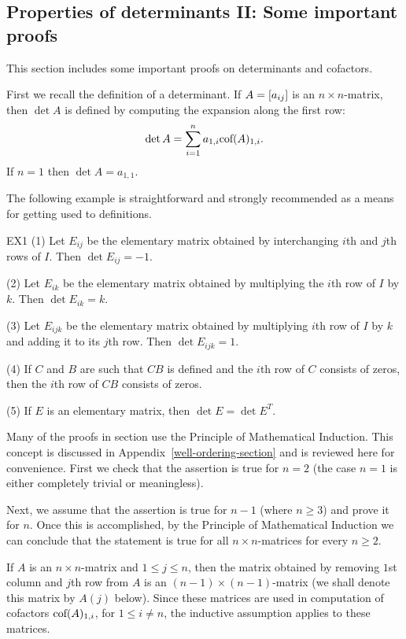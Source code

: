 \subsection{Properties of determinants II: Some important proofs } \label{sec:determinant-proofs}

This section includes some important proofs on determinants and cofactors.

First we recall the definition of a determinant. If $A=\left[a_{ij} \right]$ is an $n\times n$-matrix, then $\det A$ is defined by computing the expansion along the first row:
\begin{equation}
\label{E1} 
\det A=\sum_{i=1}^n a_{1,i} \mbox{\rm cof}(A)_{1,i}. 
\end{equation}
If $n=1$ then $\det A=a_{1,1}$. 

The following example is straightforward and strongly recommended as a means for
getting used to definitions. 

\begin{example}{}{EX1}
(1) Let $E_{ij}$ be the elementary matrix obtained by interchanging $i$th and $j$th rows of $I$. 
Then $\det E_{ij}=-1$. 

(2) Let $E_{ik}$ be the elementary matrix obtained by multiplying the $i$th row of $I$ by $k$. 
Then $\det E_{ik}=k$. 

(3) Let $E_{ijk}$ be the elementary matrix obtained by multiplying $i$th row of $I$ by $k$ and 
adding it to its $j$th row. Then $\det E_{ijk}=1$. 

(4) If $C$ and $B$ are such that $CB$ is defined and the $i$th row of $C$ consists of zeros, 
then the $i$th row of $CB$ consists of zeros. 

(5) If $E$ is an elementary matrix, then $\det E=\det E^T$. 
\end{example} 

Many of the proofs in section use the Principle of Mathematical Induction. This concept is discussed in Appendix~\ref{well-ordering-section} and is reviewed here for convenience.
First we check that the assertion is true for $n=2$ (the case $n=1$ is either completely trivial
or meaningless). 

Next, we assume that the assertion is true for $n-1$ (where $n\geq 3$) and prove it for $n$. 
Once this is accomplished, by the Principle of Mathematical Induction we can conclude that the 
statement is true for all $n\times n$-matrices for every $n\geq 2$. 

If $A$ is an $n\times n$-matrix and $1\leq j \leq n$,
then the matrix obtained by removing $1$st column and $j$th row from $A$ 
is an $(n-1)\times (n-1)$-matrix (we shall denote this matrix by $A(j)$ below). Since these matrices 
are used in computation of cofactors $\mbox{\rm cof}(A)_{1,i}$, for $1\leq i\neq n$, 
the inductive assumption applies to these matrices. 

